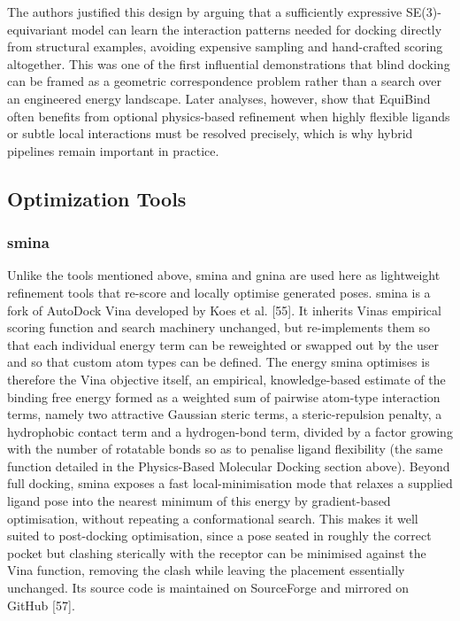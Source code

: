 The authors justified this design by arguing that a sufficiently expressive SE(3)-equivariant model can learn the interaction patterns needed for docking directly from structural examples, avoiding expensive sampling and hand-crafted scoring altogether. This was one of the first influential demonstrations that blind docking can be framed as a geometric correspondence problem rather than a search over an engineered energy landscape. Later analyses, however, show that EquiBind often benefits from optional physics-based refinement when highly flexible ligands or subtle local interactions must be resolved precisely, which is why hybrid pipelines remain important in practice.

\hypertarget{optimization-tools-1}{%
\subsection{Optimization Tools}\label{optimization-tools-1}}

\hypertarget{smina-1}{%
\subsubsection{smina}\label{smina-1}}

Unlike the tools mentioned above, smina and gnina are used here as lightweight refinement tools that re-score and locally optimise generated poses. smina is a fork of AutoDock Vina developed by Koes et al. {[}55{]}. It inherits Vina\textquotesingle s empirical scoring function and search machinery unchanged, but re-implements them so that each individual energy term can be reweighted or swapped out by the user and so that custom atom types can be defined. The energy smina optimises is therefore the Vina objective itself, an empirical, knowledge-based estimate of the binding free energy formed as a weighted sum of pairwise atom-type interaction terms, namely two attractive Gaussian steric terms, a steric-repulsion penalty, a hydrophobic contact term and a hydrogen-bond term, divided by a factor growing with the number of rotatable bonds so as to penalise ligand flexibility (the same function detailed in the Physics-Based Molecular Docking section above). Beyond full docking, smina exposes a fast local-minimisation mode that relaxes a supplied ligand pose into the nearest minimum of this energy by gradient-based optimisation, without repeating a conformational search. This makes it well suited to post-docking optimisation, since a pose seated in roughly the correct pocket but clashing sterically with the receptor can be minimised against the Vina function, removing the clash while leaving the placement essentially unchanged. Its source code is maintained on SourceForge and mirrored on GitHub {[}57{]}.

